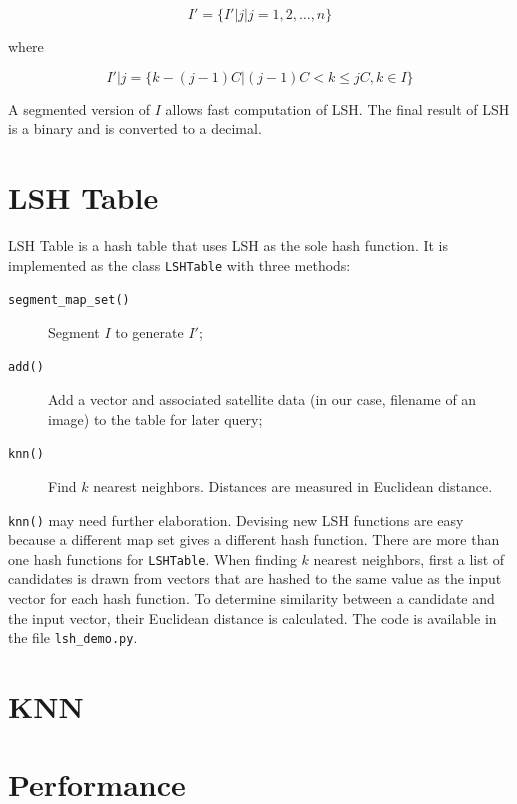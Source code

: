 \documentclass{ee208report}
\begin{document}
\begin{multicols*}{2}
\[
    I' = \{I'|j|j = 1, 2,\dots, n\}
\]

where

\[
    I'|j = \{k - (j - 1)C|(j - 1)C < k \leq jC, k \in I\}
\]

A segmented version of $I$ allows fast computation of LSH. The final result of
LSH is a binary and is converted to a decimal.

\section{LSH Table}

LSH Table is a hash table that uses LSH as the sole hash function. It is
implemented as the class \texttt{LSHTable} with three methods:

\begin{description}
    \item[\texttt{segment\_map\_set()}] Segment $I$ to generate $I'$;
    \item[\texttt{add()}] Add a vector and associated satellite data (in our
    case, filename of an image) to the table for later query;
    \item[\texttt{knn()}] Find $k$ nearest neighbors. Distances are measured in
    Euclidean distance.
\end{description}

\texttt{knn()} may need further elaboration. Devising new LSH functions are easy
because a different map set gives a different hash function. There are more than
one hash functions for \texttt{LSHTable}. When finding $k$ nearest neighbors,
first a list of candidates is drawn from vectors that are hashed to the same
value as the input vector for each hash function. To determine similarity
between a candidate and the input vector, their Euclidean distance is
calculated. The code is available in the file \texttt{lsh\_demo.py}.

\section{KNN}

\section{Performance}

\end{multicols*}
\end{document}
